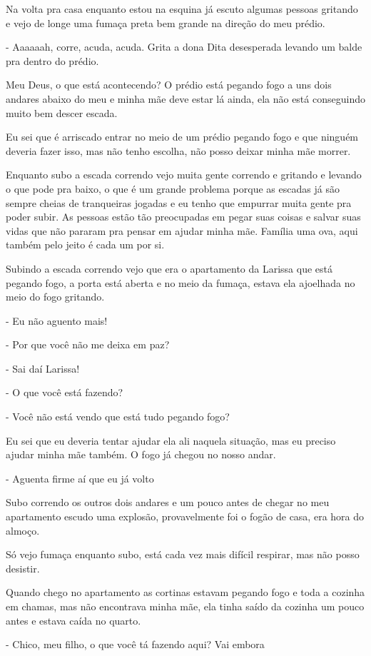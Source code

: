 Na volta pra casa enquanto estou na esquina já escuto algumas pessoas gritando e vejo de longe uma fumaça preta bem grande na direção do meu prédio.

- Aaaaaah, corre, acuda, acuda. Grita a dona Dita desesperada levando um balde pra dentro do prédio.

Meu Deus, o que está acontecendo? O prédio está pegando fogo a uns dois andares abaixo do meu e minha mãe deve estar lá ainda, ela não está conseguindo muito bem descer escada.

Eu sei que é arriscado entrar no meio de um prédio pegando fogo e que ninguém deveria fazer isso, mas não tenho escolha, não posso deixar minha mãe morrer.

Enquanto subo a escada correndo vejo muita gente correndo e gritando e levando o que pode pra baixo, o que é um grande problema porque as escadas já são sempre cheias de tranqueiras jogadas e eu tenho que empurrar muita gente pra poder subir. As pessoas estão tão preocupadas em pegar suas coisas e salvar suas vidas que não pararam pra pensar em ajudar minha mãe. Família uma ova, aqui também pelo jeito é cada um por si.

Subindo a escada correndo vejo que era o apartamento da Larissa que está pegando fogo, a porta está aberta e no meio da fumaça, estava ela ajoelhada no meio do fogo gritando.

- Eu não aguento mais!

- Por que você não me deixa em paz?

- Sai daí Larissa!

- O que você está fazendo?

- Você não está vendo que está tudo pegando fogo?

Eu sei que eu deveria tentar ajudar ela ali naquela situação, mas eu preciso ajudar minha mãe também. O fogo já chegou no nosso andar.

- Aguenta firme aí que eu já volto

Subo correndo os outros dois andares e um pouco antes de chegar no meu apartamento escudo uma explosão, provavelmente foi o fogão de casa, era hora do almoço.

Só vejo fumaça enquanto subo, está cada vez mais difícil respirar, mas não posso desistir.

Quando chego no apartamento as cortinas estavam pegando fogo e toda a cozinha em chamas, mas não encontrava minha mãe, ela tinha saído da cozinha um pouco antes e estava caída no quarto.

- Chico, meu filho, o que você tá fazendo aqui? Vai embora

